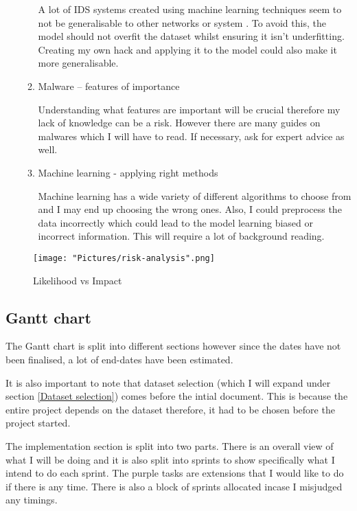 \documentclass[11pt]{article}
\begin{document}
\begin{enumerate}
\begin{enumerate}
    A lot of IDS systems created using machine learning techniques seem to not be generalisable to other networks or system \cite{methodology-general}. To avoid this, the model should not overfit the dataset whilst ensuring it isn't underfitting. Creating my own hack and applying it to the model could also make it more generalisable.

    \item{Malware – features of importance}

    Understanding what features are important will be crucial therefore my lack of knowledge can be a risk. However there are many guides on malwares which I will have to read. If necessary, ask for expert advice as well.
  
    \item{Machine learning - applying right methods}

    Machine learning has a wide variety of different algorithms to choose from and I may end up choosing the wrong ones. Also, I could preprocess the data incorrectly which could lead to the model learning biased or incorrect information. This will  require a lot of background reading.
  \end{enumerate}
\end{enumerate}

\begin{figure}[h!]
   \texttt{[image: "Pictures/risk-analysis".png]}
   \caption{Likelihood vs Impact}
   \label{fig:risk-analysis}
\end{figure}


\subsection{Gantt chart}
The Gantt chart is split into different sections however since the dates have not been finalised, a lot of end-dates have been estimated. 

It is also important to note that dataset selection (which I will expand under section \ref{Dataset selection}) comes before the intial document. This is because the entire project depends on the dataset therefore, it had to be chosen before the project started.

The implementation section is split into two parts. There is an overall view of what I will be doing and it is also split into sprints to show specifically what I intend to do each sprint. The purple tasks are extensions that I would like to do if there is any time. There is also a block of sprints allocated incase I misjudged any timings.
\end{document}
